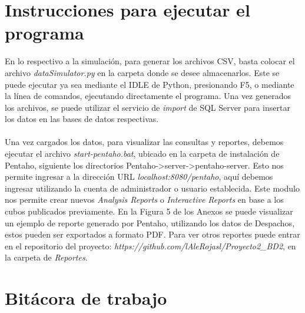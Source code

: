 \documentclass{article}
\let\>\textgreater
\begin{document}
\section{Instrucciones para ejecutar el programa}
En lo respectivo a la simulaci\'on, para generar los archivos CSV, basta colocar el archivo \emph{dataSimulator.py} en la carpeta donde se desee almacenarlos. Este se puede ejecutar ya sea mediante el IDLE de Python, presionando F5, o mediante la l\'inea de comandos, ejecutando directamente el programa. Una vez generados los archivos, se puede utilizar el servicio de \emph{import} de SQL Server para insertar los datos en las bases de datos respectivas.\\\\
Una vez cargados los datos, para visualizar las consultas y reportes, debemos ejecutar el archivo \emph{start-pentaho.bat}, ubicado en la carpeta de instalaci\'on de Pentaho, siguiente los directorios Pentaho-\>server-\>pentaho-server. Esto nos permite ingresar a la direcci\'on URL \emph{localhost:8080/pentaho}, aqu\'i debemos ingresar utilizando la cuenta de administrador o usuario establecida. Este modulo nos permite crear nuevos \emph{Analysis Reports} o \emph{Interactive Reports} en base a los cubos publicados previamente. En la Figura 5 de los Anexos se puede visualizar un ejemplo de reporte generado por Pentaho, utilizando los datos de Despachos, estos pueden ser exportados a formato PDF. Para ver otros reportes puede entrar en el repositorio del proyecto: \emph{https://github.com/lAleRojasl/Proyecto2\_BD2}, en la carpeta de \emph{Reportes}.


\section{Bit\'acora de trabajo}
\end{document}
